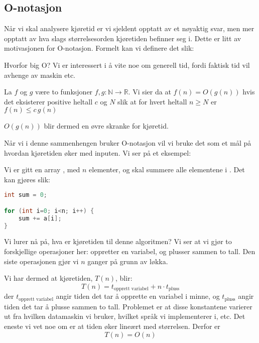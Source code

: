 \subsection{O-notasjon}
Når vi skal analysere kjøretid er vi sjeldent opptatt av et nøyaktig svar, men mer opptatt av hva slags størrelsesorden kjøretiden befinner seg i. Dette er litt av motivasjonen for O-notasjon. Formelt kan vi definere det slik:

Hvorfor big O? Vi er interessert i å vite noe om generell tid, fordi faktisk tid vil avhenge av maskin etc. 

\begin{definition}
\label{def:O}
La $ f $ og $ g $ være to funksjoner $ f, g:\mathbb{N} \rightarrow \mathbb{R} $. Vi sier da at $ f(n) = O(g(n))$ hvis det eksisterer positive heltall $ c $ og $ N $ slik at for hvert heltall $ n\geq N $ er $ f(n) \leq c\,g(n) $
\end{definition}
$ O(g(n)) $ blir dermed en øvre skranke for kjøretid.

Når vi i denne sammenhengen bruker O-notasjon vil vi bruke det som et mål på hvordan kjøretiden øker med inputen. Vi ser på et eksempel:

\begin{example}
Vi er gitt en array , med $ n $ elementer, og skal summere alle elementene i . Det kan gjøres slik:
\begin{lstlisting}[language=Java,
commentstyle=\color{source_brown}\monofontitalic, 
morekeywords={String},
keywordstyle=\color{source_blue}\monofontbold,
stringstyle=\color{source_orange}]
int sum = 0;

for (int i=0; i<n; i++) {
	sum += a[i];
}
\end{lstlisting}
Vi lurer nå på, hva er kjøretiden til denne algoritmen? Vi ser at vi gjør to forskjellige operasjoner her: oppretter en variabel, og plusser sammen to tall. Den siste operasjonen gjør vi $ n $ ganger på grunn av løkka.

Vi har dermed at kjøretiden, $ T(n) $, blir:
\[ T(n) = t_{\text{opprett variabel}} + n \cdot t_{\text{pluss}}  \]
der $ t_{\text{opprett variabel}} $ angir tiden det tar å opprette en variabel i minne, og $ t_{\text{pluss}} $ angir tiden det tar å plusse sammen to tall. Problemet er at disse konstantene varierer ut fra hvilken datamaskin vi bruker, hvilket språk vi implementerer i, etc. Det eneste vi vet noe om er at tiden øker lineært med størrelsen. Derfor er 
\[ T(n) = O(n) \]
\end{example}


